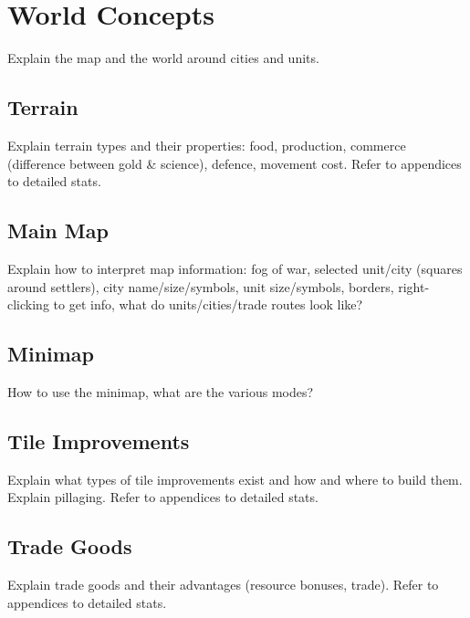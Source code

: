 \chapter{World Concepts}
Explain the map and the world around cities and units.

\section{Terrain}
Explain terrain types and their properties: food, production, commerce
(difference between gold \& science), defence, movement cost. Refer to
appendices to detailed stats.

\section{Main Map}
Explain how to interpret map information: fog of war, selected unit/city
(squares around settlers), city name/size/symbols, unit size/symbols, borders,
right-clicking to get info, what do units/cities/trade routes look like? 

\section{Minimap}
How to use the minimap, what are the various modes?

\section{Tile Improvements}
Explain what types of tile improvements exist and how and where to build them.
Explain pillaging. Refer to appendices to detailed stats.

\section{Trade Goods}
Explain trade goods and their advantages (resource bonuses, trade). Refer to
appendices to detailed stats.

